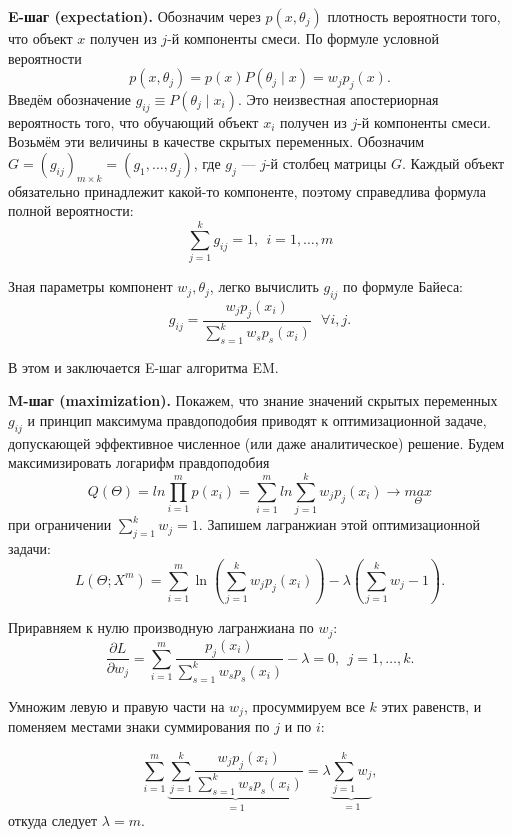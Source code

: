     \vspace{\baselineskip}
    \textbf{E-шаг (expectation).} Обозначим через $p(x, \theta_j)$ плотность вероятности того, что объект $x$ получен из $j$-й компоненты смеси. По формуле условной вероятности
    $$p(x, \theta_j) = p(x)P(\theta_j \mid x) = w_jp_j(x).$$ 
    Введём обозначение $g_{ij} \equiv P(\theta_j
    \mid x_i)$. Это неизвестная апостериорная вероятность того, что обучающий объект $x_i$ получен из $j$-й компоненты смеси. Возьмём эти величины в качестве скрытых переменных. Обозначим $G = (g_{ij} )_{m \times k} = (g_1, \dots , g_j)$, где $g_j$ --- $j$-й столбец матрицы $G$. Каждый объект обязательно принадлежит какой-то компоненте, поэтому справедлива формула полной вероятности:
    $$\sum_{j=1}^k g_{ij} = 1, \ \ i = 1, \dots, m$$
    
    Зная параметры компонент $w_j, \theta_j$, легко вычислить $g_{ij}$ по формуле Байеса:
    \begin{equation}
        \label{eqn:1}
        g_{ij} = \frac{w_jp_j(x_i)}{\sum_{s=1}^k w_s p_s(x_i)} \ \ \  \forall i,j.
    \end{equation}
    
    В этом и заключается E-шаг алгоритма EM.

    \vspace{\baselineskip}
    \textbf{M-шаг (maximization).} Покажем, что знание значений скрытых переменных $g_{ij}$ и принцип максимума правдоподобия приводят к оптимизационной задаче, допускающей эффективное численное (или даже аналитическое) решение. Будем максимизировать логарифм правдоподобия
    $$Q(\Theta) = ln\prod_{i=1}^m p(x_i) = \sum_{i=1}^m ln \sum_{j=1}^k w_jp_j(x_i) \to \underset{\Theta}{max}$$
    при ограничении $\sum_{j=1}^k w_j = 1$. Запишем лагранжиан этой оптимизационной задачи:
    $$L(\Theta; X^m) = \sum_{i=1}^m \ln \left(\sum_{j=1}^k w_jp_j(x_i)\right) - \lambda \left(\sum_{j=1}^k w_j - 1\right).$$

    Приравняем к нулю производную лагранжиана по $w_j$:
    \begin{equation}
        \label{eqn:2}
        \frac{\partial L}{\partial w_j} = \sum_{i=1}^m \frac{p_j(x_i)}{\sum_{s=1}^k w_sp_s(x_i) } - \lambda = 0, \ \ j = 1, \dots, k.
    \end{equation}
    
    Умножим левую и правую части на $w_j$, просуммируем все $k$ этих равенств, и поменяем местами знаки суммирования по $j$ и по $i$:
    
    $$\sum_{i=1}^m \underbrace{\sum_{j=1}^k \frac{w_jp_j(x_i)}{\sum_{s=1}^k w_sp_s(x_i)}}_{=1} = \lambda \underbrace{\sum_{j=1}^k w_j}_{=1}, $$
    откуда следует $\lambda = m$.
    
